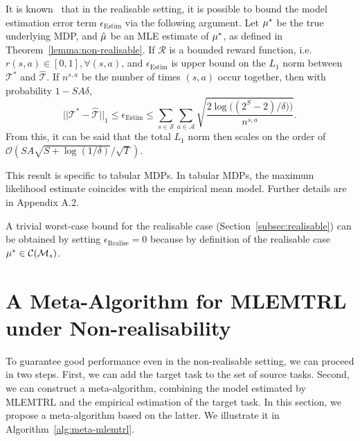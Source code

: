 \begin{remark}\label{remark:l1_norm}
It is known~\citep{strehl2005theoretical, auer2008near, qian2020concentration} that in the realisable setting, it is possible to bound the model estimation error term $\epsilon_{\mathrm{Estim}}$ via the following argument. Let $\mu^*$ be the true underlying MDP, and $\hat{\mu}$ be an MLE estimate of $\mu^*$, as defined in Theorem~\ref{lemma:non-realisable}. If $\mathcal{R}$ is a bounded reward function, i.e. $r(s, a) \in [0, 1], \forall{(s, a)}$, and $\epsilon_{\mathrm{Estim}}$ is upper bound on the $L_1$ norm between $\mathcal{T}^*$ and $\hat{\mathcal{T}}$. If $n^{s,a}$ be the number of times $(s,a)$ occur together, then with probability $1-SA\delta$,
\begin{equation*}
        ||\mathcal{T}^*-\hat{\mathcal{T}}||_1 \leq \epsilon_{\mathrm{Estim}} \leq \sum_{s\in\mathcal{S}}\sum_{a\in\mathcal{A}}\sqrt{\frac{2\log\big((2^S -2)/\delta)\big)}{n^{s,a}}}. %
\end{equation*}
    From this, it can be said that the total $L_1$ norm then scales on the order of $\mathcal{O}(SA\sqrt{S+\log(1/\delta)}/\sqrt{T})$.
\end{remark}
This result is specific to tabular MDPs. In tabular MDPs, the maximum likelihood estimate coincides with the empirical mean model. Further details are in %
Appendix A.2.

\begin{remark}
A trivial worst-case bound for the realisable case (Section~\ref{subsec:realisable}) can be obtained by setting $\epsilon_{\mathrm{Realise}}=0$ because by definition of the realisable case $\mu^{*} \in \mathcal{C}(\mathcal{M}_s)$.
\end{remark}


\section{A Meta-Algorithm for MLEMTRL under Non-realisability}\label{sec:meta_mlemtrl}

To guarantee good performance even in the non-realisable setting, we can proceed in two steps. First, we can add the target task to the set of source tasks. Second, we can construct a meta-algorithm, combining the model estimated by MLEMTRL and the empirical estimation of the target task. In this section, we propose a meta-algorithm based on the latter. We illustrate it in Algorithm~\ref{alg:meta-mlemtrl}. 

